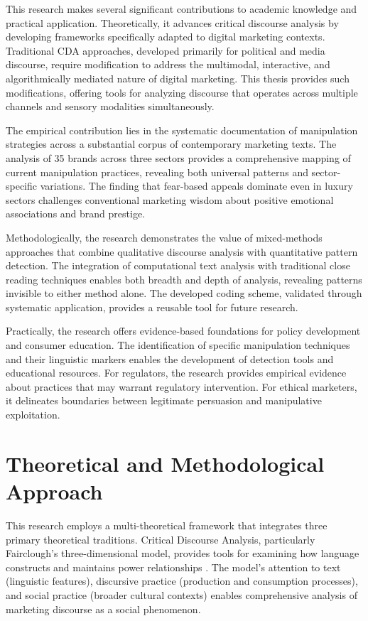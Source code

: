 This research makes several significant contributions to academic knowledge and practical application. Theoretically, it advances critical discourse analysis by developing frameworks specifically adapted to digital marketing contexts. Traditional CDA approaches, developed primarily for political and media discourse, require modification to address the multimodal, interactive, and algorithmically mediated nature of digital marketing. This thesis provides such modifications, offering tools for analyzing discourse that operates across multiple channels and sensory modalities simultaneously.

The empirical contribution lies in the systematic documentation of manipulation strategies across a substantial corpus of contemporary marketing texts. The analysis of 35 brands across three sectors provides a comprehensive mapping of current manipulation practices, revealing both universal patterns and sector-specific variations. The finding that fear-based appeals dominate even in luxury sectors challenges conventional marketing wisdom about positive emotional associations and brand prestige.

Methodologically, the research demonstrates the value of mixed-methods approaches that combine qualitative discourse analysis with quantitative pattern detection. The integration of computational text analysis with traditional close reading techniques enables both breadth and depth of analysis, revealing patterns invisible to either method alone. The developed coding scheme, validated through systematic application, provides a reusable tool for future research.

Practically, the research offers evidence-based foundations for policy development and consumer education. The identification of specific manipulation techniques and their linguistic markers enables the development of detection tools and educational resources. For regulators, the research provides empirical evidence about practices that may warrant regulatory intervention. For ethical marketers, it delineates boundaries between legitimate persuasion and manipulative exploitation.

\section{Theoretical and Methodological Approach}
\label{sec:theoretical_approach}

This research employs a multi-theoretical framework that integrates three primary theoretical traditions. Critical Discourse Analysis, particularly Fairclough's three-dimensional model, provides tools for examining how language constructs and maintains power relationships \cite{fairclough2015language}. The model's attention to text (linguistic features), discursive practice (production and consumption processes), and social practice (broader cultural contexts) enables comprehensive analysis of marketing discourse as a social phenomenon.

